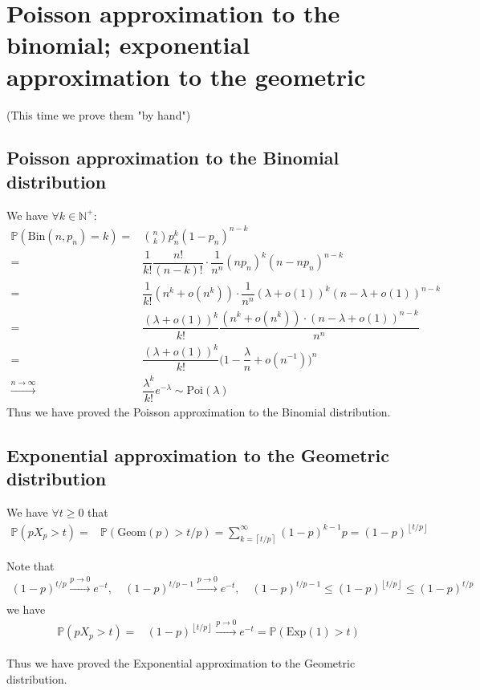\documentclass[11pt,a4paper]{article}
\numberwithin{equation}{section}%
\begin{document}
    

\section{Poisson approximation to the binomial; exponential approximation to the geometric}
(This time we prove them "by hand")

\subsection{Poisson approximation to the Binomial distribution}

We have $ \forall k\in \mathbb{N}^+: $
\begin{align*}
    \mathbb{P}\left( \mathrm{ Bin }(n,p_n) = k \right) =&  \binom{n}{k} p_n^k (1-p_n)^{n-k} \\
    =&  \dfrac{ 1 }{ k! }\dfrac{ n! }{ (n-k)! }\cdot \dfrac{ 1 }{ n^n } (np_n)^k (n-np_n)^{n-k} \\
    =& \dfrac{ 1 }{ k! }(n^k + o(n^k))\cdot \dfrac{ 1 }{ n^n } (\lambda +o(1))^k (n-\lambda +o(1))^{n-k} \\
    =& \dfrac{ (\lambda +o(1))^k }{ k! }\dfrac{ (n^k + o(n^k))\cdot(n-\lambda +o(1))^{n-k}  }{ n^n } \\
    =&\dfrac{ (\lambda +o(1))^k }{ k! }\big(1 - \dfrac{ \lambda  }{ n } + o(n^{-1}) \big)^n\\
    \xrightarrow[]{n\to\infty} & \dfrac{ \lambda^k }{ k! }e^{-\lambda }\sim \mathrm{ Poi }(\lambda ) 
\end{align*}
Thus we have proved the Poisson approximation to the Binomial distribution.


\subsection{Exponential approximation to the Geometric distribution}
We have $ \forall t \geq 0$ that 
\begin{align*}
    \mathbb{P}\left( pX_p > t \right) =& \mathbb{P}\left( \mathrm{ Geom }(p)  > t/p \right)= \sum_{k= \left\lceil t/p\right\rceil } ^\infty (1-p)^{k-1}p=(1-p)^{\left\lfloor t/p \right\rfloor } 
\end{align*}

Note that
\begin{align*}
    (1-p)^{t/p} \xrightarrow[]{p\to 0} e^{-t},\quad (1-p)^{t/p-1} \xrightarrow[]{p\to 0} e^{-t},\quad (1-p)^{t/p-1}\leq (1-p)^{\left\lfloor t/p \right\rfloor } \leq (1-p)^{t/p}
\end{align*}
we have
\begin{align*}
    \mathbb{P}\left( pX_p > t \right) =&(1-p)^{\left\lfloor t/p \right\rfloor } \xrightarrow[]{p\to 0} e^{-t} = \mathbb{P}\left( \mathrm{ Exp }(1) > t \right)
\end{align*}

Thus we have proved the Exponential approximation to the Geometric distribution.
\end{document}
